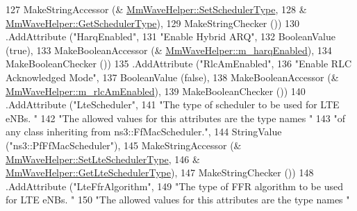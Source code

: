 \begin{DoxyCode}
127                                       MakeStringAccessor (&
      \hyperlink{classns3_1_1MmWaveHelper_ae38f5e96d749ab63dda7746f43dfbe84}{MmWaveHelper::SetSchedulerType},
128                                                           &
      \hyperlink{classns3_1_1MmWaveHelper_ab4b78464bef4498dc6f7a9a293014587}{MmWaveHelper::GetSchedulerType}),
129                                       MakeStringChecker ())
130           .AddAttribute (\textcolor{stringliteral}{"HarqEnabled"},
131                                         \textcolor{stringliteral}{"Enable Hybrid ARQ"},
132                                         BooleanValue (\textcolor{keyword}{true}),
133                                         MakeBooleanAccessor (&
      \hyperlink{classns3_1_1MmWaveHelper_a56142ee76b853ab0fa13918aeb6800e9}{MmWaveHelper::m\_harqEnabled}),
134                                         MakeBooleanChecker ())
135                 .AddAttribute (\textcolor{stringliteral}{"RlcAmEnabled"},
136                                         \textcolor{stringliteral}{"Enable RLC Acknowledged Mode"},
137                                         BooleanValue (\textcolor{keyword}{false}),
138                                         MakeBooleanAccessor (&
      \hyperlink{classns3_1_1MmWaveHelper_a47e5d8166922f0be28d1e29e18d2e1f9}{MmWaveHelper::m\_rlcAmEnabled}),
139                                         MakeBooleanChecker ())
140             .AddAttribute (\textcolor{stringliteral}{"LteScheduler"},
141                            \textcolor{stringliteral}{"The type of scheduler to be used for LTE eNBs. "}
142                            \textcolor{stringliteral}{"The allowed values for this attributes are the type names "}
143                            \textcolor{stringliteral}{"of any class inheriting from ns3::FfMacScheduler."},
144                            StringValue (\textcolor{stringliteral}{"ns3::PfFfMacScheduler"}),
145                            MakeStringAccessor (&
      \hyperlink{classns3_1_1MmWaveHelper_a46545a203927cdcf48448c740332fcde}{MmWaveHelper::SetLteSchedulerType},
146                                                &
      \hyperlink{classns3_1_1MmWaveHelper_a32b038faf4e0e47054d31da50f7332ad}{MmWaveHelper::GetLteSchedulerType}),
147                            MakeStringChecker ())
148             .AddAttribute (\textcolor{stringliteral}{"LteFfrAlgorithm"},
149                            \textcolor{stringliteral}{"The type of FFR algorithm to be used for LTE eNBs. "}
150                            \textcolor{stringliteral}{"The allowed values for this attributes are the type names "}

\end{DoxyCode}
